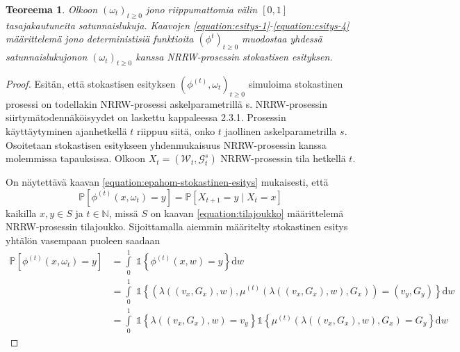 \documentclass[finnish, 12pt, a4paper, sci, utf8, pdfa]{aaltothesis}
\newcommand{\N}{\mathbb{N}}
\newcommand{\Grandom}{\mathcal{G}}
\newcommand{\Wrandom}{\mathcal{W}}
\newcommand{\indicator}{\mathopen{\mathds{1}}}
\newcommand*{\prob}{\mathbb{P}}
\newtheorem{theorem}{Teoreema}
\begin{document}
\begin{theorem}
Olkoon $ (\omega_{t})_{t \geq 0} $ jono riippumattomia välin $ [0, 1] $ tasajakautuneita satunnaislukuja. Kaavojen \ref{equation:esitys-1}-\ref{equation:esitys-4} määrittelemä jono deterministisiä funktioita $ (\phi^{t})_{t \geq 0} $ muodostaa yhdessä satunnaislukujonon $ (\omega_{t})_{t \geq 0} $ kanssa NRRW-prosessin stokastisen esityksen.
\end{theorem}

\begin{proof}

Esitän, että stokastisen esityksen \( (\phi^{(t)}, \omega_{t})_{t \geq 0} \) simuloima stokastinen prosessi on todellakin NRRW-prosessi askelparametrillä s. NRRW-prosessin siirtymätodennäköisyydet on laskettu kappaleessa 2.3.1. Prosessin käyttäytyminen ajanhetkellä $ t $ riippuu siitä, onko $ t $ jaollinen askelparametrilla $ s $. Osoitetaan stokastisen esitykseen yhdenmukaisuus NRRW-prosessin kanssa molemmissa tapauksissa. Olkoon $ X_{t} = (\Wrandom_{t}, \Grandom^{s}_{t}) $ NRRW-prosessin tila hetkellä $ t $. 

On näytettävä kaavan \ref{equation:epahom-stokastinen-esitys} mukaisesti, että
\begin{equation}
   \prob \left[ \phi^{(t)}(x, \omega_{t}) = y \right] = \prob \left[ X_{t+1} = y \mid X_{t} = x \right] 
\end{equation}
kaikilla $ x, y \in S $ ja $ t \in \N $, missä $ S $ on kaavan \ref{equation:tilajoukko} määrittelemä NRRW-prosessin tilajoukko. Sijoittamalla aiemmin määritelty stokastinen esitys yhtälön vasempaan puoleen saadaan
\begin{align*}
   \prob \left[ \phi^{(t)}(x, \omega_{t}) = y \right] &= \int\limits_0^1 \; \indicator \left\{ \phi^{(t)}(x, w) = y \right\} \mathrm{d}w \\
                                                &= \int\limits_0^1 \; \indicator \left\{ \left( \lambda\left( (v_{x}, G_{x}), w \right), \mu^{(t)} \left( \lambda\left( (v_{x}, G_{x}), w \right), G_{x} \right) \right) = (v_{y}, G_{y}) \right\} \mathrm{d}w \\
                                                &= \int\limits_0^1 \; \indicator \left\{ \lambda\left( (v_{x}, G_{x}), w \right) = v_{y} \right\} \indicator \left\{ \mu^{(t)} \left( \lambda\left( (v_{x}, G_{x}), w \right), G_{x} \right) = G_{y} \right\} \mathrm{d}w
\end{align*}


\end{proof}
\end{document}
